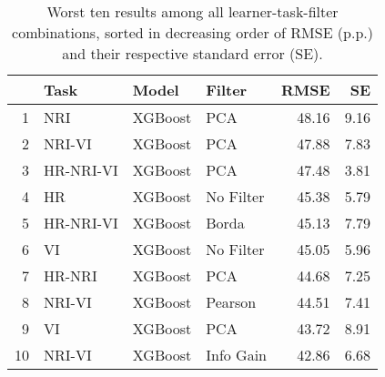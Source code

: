 \begin{table}[ht!]
\centering
\caption{Worst ten results among all learner-task-filter combinations, sorted in decreasing order of RMSE (p.p.) and their respective standard error (SE).} 
\label{tab:perf-worst-10}
\begin{tabular}{rlllrr}
  \hline
 & Task & Model & Filter & RMSE & SE \\ 
  \hline
1 & NRI & XGBoost & PCA & 48.16 & 9.16 \\ 
  2 & NRI-VI & XGBoost & PCA & 47.88 & 7.83 \\ 
  3 & HR-NRI-VI & XGBoost & PCA & 47.48 & 3.81 \\ 
  4 & HR & XGBoost & No Filter & 45.38 & 5.79 \\ 
  5 & HR-NRI-VI & XGBoost & Borda & 45.13 & 7.79 \\ 
  6 & VI & XGBoost & No Filter & 45.05 & 5.96 \\ 
  7 & HR-NRI & XGBoost & PCA & 44.68 & 7.25 \\ 
  8 & NRI-VI & XGBoost & Pearson & 44.51 & 7.41 \\ 
  9 & VI & XGBoost & PCA & 43.72 & 8.91 \\ 
  10 & NRI-VI & XGBoost & Info Gain & 42.86 & 6.68 \\ 
   \hline
\end{tabular}
\end{table}
